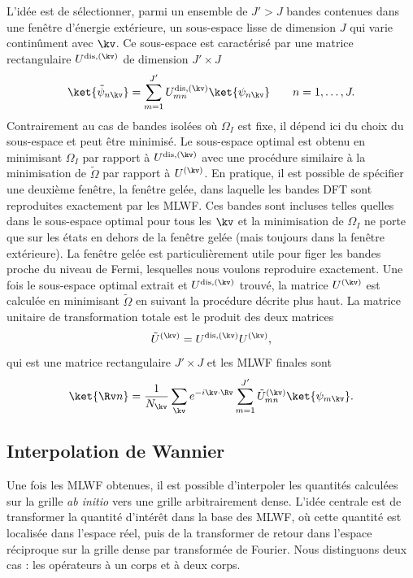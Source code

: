 L'idée est de sélectionner, parmi un ensemble de $J'>J$ bandes contenues dans une fenêtre d'énergie extérieure, un sous-espace lisse de dimension $J$ qui varie continûment avec $\kv$. Ce sous-espace est caractérisé par une matrice rectangulaire $U^{\text{dis},(\kv)}$ de dimension $J'\times J$
\begin{equation}
    \ket{\tilde{\psi}_{n\kv}}=\sum_{m=1}^{J'}U_{mn}^{\text{dis},(\kv)}\ket{\psi_{n\kv}}\qquad n=1,\dots,J.
\end{equation}
Contrairement au cas de bandes isolées où $\Omega_I$ est fixe, il dépend ici du choix du sous-espace et peut être minimisé. Le sous-espace optimal est obtenu en minimisant $\Omega_I$ par rapport à $U^{\text{dis},(\kv)}$ avec une procédure similaire à la minimisation de $\widetilde{\Omega}$ par rapport à $U^{(\kv)}$. En pratique, il est possible de spécifier une deuxième fenêtre, la fenêtre gelée, dans laquelle les bandes DFT sont reproduites exactement par les MLWF. Ces bandes sont incluses telles quelles dans le sous-espace optimal pour tous les $\kv$ et la minimisation de $\Omega_I$ ne porte que sur les états en dehors de la fenêtre gelée (mais toujours dans la fenêtre extérieure). La fenêtre gelée est particulièrement utile pour figer les bandes proche du niveau de Fermi, lesquelles nous voulons reproduire exactement. Une fois le sous-espace optimal extrait et $U^{\text{dis},(\kv)}$ trouvé, la matrice $U^{(\kv)}$ est calculée en minimisant $\widetilde{\Omega}$ en suivant la procédure décrite plus haut. La matrice unitaire de transformation totale est le produit des deux matrices
\begin{equation}
    \tilde{U}^{(\kv)} = U^{\text{dis},(\kv)}U^{(\kv)},
\end{equation}
qui est une matrice rectangulaire $J'\times J$ et les MLWF finales sont
\begin{equation}
    \ket{\Rv n}=\frac{1}{N_\kv}\sum_{\kv}e^{-i\kv\cdot\Rv}\sum_{m=1}^{J'}\tilde{U}^{(\kv)}_{mn}\ket{\psi_{m\kv}}.\label{eqn:c3_mlwf}
\end{equation}

\subsection{Interpolation de Wannier}
Une fois les MLWF obtenues, il est possible d'interpoler les quantités calculées sur la grille \textit{ab initio} vers une grille arbitrairement dense. L'idée centrale est de transformer la quantité d'intérêt dans la base des MLWF, où cette quantité est localisée dans l'espace réel, puis de la transformer de retour dans l'espace réciproque sur la grille dense par transformée de Fourier. Nous distinguons deux cas : les opérateurs à un corps et à deux corps. 

